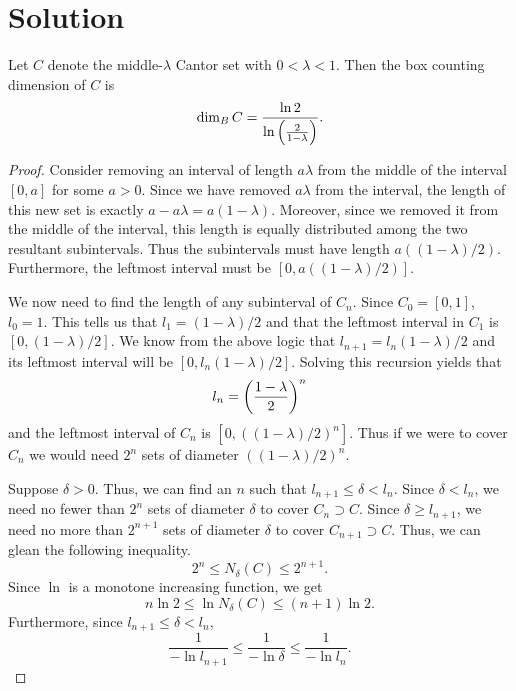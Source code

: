 \documentclass[notitlepage]{simple}
\def\dim{\operatorname{dim}}
\begin{document}
	\section{Solution}

	\begin{thm}
		Let $C$ denote the middle-$\lambda$ Cantor set with $0 < \lambda < 1$.
		Then the box counting dimension of $C$ is
		\[
			\dim_B C = \frac{\ln 2}{\ln\paren{\frac{2}{1-\lambda}}}.
		\]
	\end{thm}
	\begin{proof}
		Consider removing an interval of length $a\lambda$ from the middle of the interval $[0,a]$ for some $a>0$.
		Since we have removed $a\lambda$ from the interval, the length of this new set is exactly $a-a\lambda=a(1-\lambda)$.
		Moreover, since we removed it from the middle of the interval, this length is equally distributed among the two resultant subintervals.
		Thus the subintervals must have length $a((1-\lambda)/2)$.
		Furthermore, the leftmost interval must be $[0,a((1-\lambda)/2)]$.

		We now need to find the length of any subinterval of $C_n$.
		Since $C_0=[0,1]$, $l_0=1$.
		This tells us that $l_1=(1-\lambda)/2$ and that the leftmost interval in $C_1$ is $[0,(1-\lambda)/2]$.
		We know from the above logic that $l_{n+1}=l_n(1-\lambda)/2$ and its leftmost interval will be $[0,l_n(1-\lambda)/2]$.
		Solving this recursion yields that
		\[
			l_n = \left( \frac{1-\lambda}{2} \right)^n
		\]
		and the leftmost interval of $C_n$ is $[0,((1-\lambda)/2)^n]$.
		Thus if we were to cover $C_n$ we would need $2^n$ sets of diameter $((1-\lambda)/2)^n$.

		Suppose $\delta >0$.
		Thus, we can find an $n$ such that $l_{n+1}\leq \delta < l_n$.
		Since $\delta < l_n$, we need no fewer than $2^n$ sets of diameter $\delta$ to cover $C_n\supset C$.
		Since $\delta \geq l_{n+1}$, we need no more than $2^{n+1}$ sets of diameter $\delta$ to cover $C_{n+1}\supset C$.
		Thus, we can glean the following inequality.
		\[
			2^{n} \leq N_\delta(C) \leq 2^{n+1}.
		\]
		Since $\ln$ is a monotone increasing function, we get
		\begin{equation}\label{ln-num}
			n\ln 2 \leq \ln N_\delta(C) \leq (n+1)\ln 2.
		\end{equation}
		Furthermore, since $l_{n+1}\leq \delta < l_n$,
		\begin{equation}\label{ln-den}
			\frac{1}{-\ln l_{n+1}} \leq \frac{1}{-\ln\delta} \leq \frac{1}{-\ln l_n}.
		\end{equation}


\end{proof}
\end{document}
